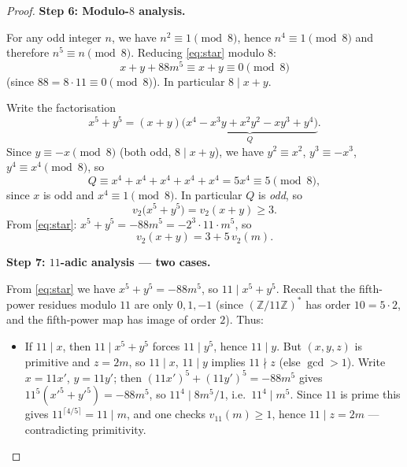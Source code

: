\documentclass[12pt]{article}
\theoremstyle{definition}
\begin{document}
\begin{proof}
\medskip

\textbf{Step 6: Modulo-$8$ analysis.}

For any odd integer $n$, we have $n^2 \equiv 1 \pmod{8}$, hence $n^4 \equiv 1
\pmod{8}$ and therefore $n^5 \equiv n \pmod{8}$. Reducing \eqref{eq:star}
modulo $8$:
\[
    x + y + 88m^5 \equiv x + y \equiv 0 \pmod{8}
\]
(since $88 = 8 \cdot 11 \equiv 0 \pmod 8$). In particular $8 \mid x + y$.

\medskip

Write the factorisation
\[
    x^5 + y^5 = (x + y)\underbrace{\bigl(x^4 - x^3 y + x^2 y^2 - x y^3 + y^4\bigr)}_{Q}.
\]
Since $y \equiv -x \pmod{8}$ (both odd, $8 \mid x+y$), we have
$y^2 \equiv x^2$, $y^3 \equiv -x^3$, $y^4 \equiv x^4 \pmod{8}$, so
\[
    Q \equiv x^4 + x^4 + x^4 + x^4 + x^4 = 5x^4 \equiv 5 \pmod{8},
\]
since $x$ is odd and $x^4 \equiv 1 \pmod 8$. In particular $Q$ is \emph{odd}, so
\[
    v_2\bigl(x^5 + y^5\bigr) = v_2(x + y) \geq 3.
\]
From \eqref{eq:star}: $x^5 + y^5 = -88m^5 = -2^3 \cdot 11 \cdot m^5$, so
\begin{equation}\label{eq:2val}
    v_2(x + y) = 3 + 5\,v_2(m).
\end{equation}

\medskip

\textbf{Step 7: $11$-adic analysis — two cases.}

From \eqref{eq:star} we have $x^5 + y^5 = -88m^5$, so $11 \mid x^5 + y^5$.
Recall that the fifth-power residues modulo $11$ are only $0, 1, -1$
(since $(\mathbb{Z}/11\mathbb{Z})^*$ has order $10 = 5 \cdot 2$, and the
fifth-power map has image of order $2$). Thus:
\begin{itemize}
    \item If $11 \mid x$, then $11 \mid x^5 + y^5$ forces $11 \mid y^5$, hence
          $11 \mid y$. But $(x,y,z)$ is primitive and $z = 2m$, so $11 \mid x$,
          $11 \mid y$ implies $11 \nmid z$ (else $\gcd > 1$). Write $x = 11x'$,
          $y = 11y'$; then $(11x')^5 + (11y')^5 = -88m^5$ gives
          $11^5(x'^5 + y'^5) = -88m^5$, so $11^4 \mid 8m^5/1$, i.e.\
          $11^4 \mid m^5$. Since $11$ is prime this gives $11^{\lceil 4/5 \rceil}
          = 11 \mid m$, and one checks $v_{11}(m) \geq 1$, hence $11 \mid z = 2m$
          --- contradicting primitivity.


\end{itemize}
\end{proof}
\end{document}
